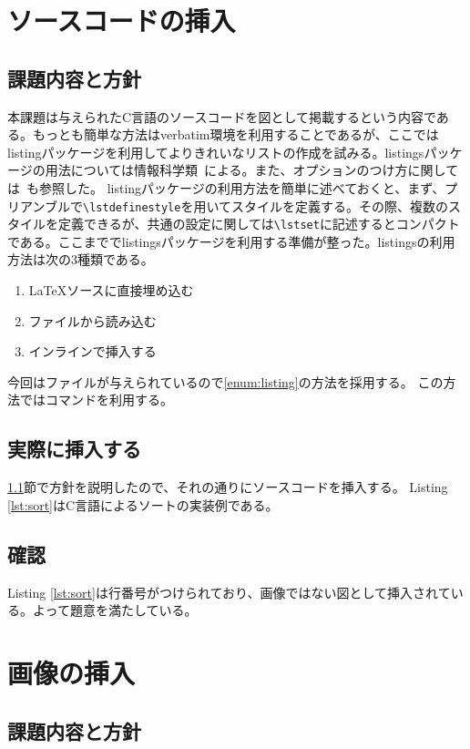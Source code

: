 \documentclass[dvipdfmx,12pt,a4j]{jarticle}
\begin{document}
\section{ソースコードの挿入}
\subsection{課題内容と方針}\label{sec:code}
本課題は与えられたC言語のソースコードを図として掲載するという内容である。もっとも簡単な方法はverbatim環境を利用することであるが、ここではlistingパッケージを利用してよりきれいなリストの作成を試みる。listingsパッケージの用法については情報科学類~\cite[p.183]{tebiki}による。また、オプションのつけ方に関しては~\cite{listing}も参照した。
listingパッケージの利用方法を簡単に述べておくと、まず、プリアンブルで\verb|\lstdefinestyle|を用いてスタイルを定義する。その際、複数のスタイルを定義できるが、共通の設定に関しては\verb|\lstset|に記述するとコンパクトである。ここまででlistingsパッケージを利用する準備が整った。listingsの利用方法は次の3種類である。
\begin{enumerate}
  \item \LaTeX ソースに直接埋め込む
  \item ファイルから読み込む \label{enum:listing}
  \item インラインで挿入する
\end{enumerate}
今回はファイルが与えられているので\ref{enum:listing}の方法を採用する。
この方法では\verb||コマンドを利用する。

\subsection{実際に挿入する}
\ref{sec:code}節で方針を説明したので、それの通りにソースコードを挿入する。
Listing \ref{lst:sort}はC言語によるソートの実装例である。

\subsection{確認}
Listing \ref{lst:sort}は行番号がつけられており、画像ではない図として挿入されている。よって題意を満たしている。

\section{画像の挿入}
\subsection{課題内容と方針}\label{subsection:方針}
\end{document}
